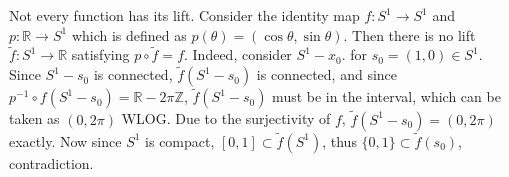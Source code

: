 %
\begin{exmp} Not every function has its lift. Consider the identity map $f:S^1\rightarrow S^1$ and $p:\mathbb{R}\rightarrow S^1$ which is defined as $p(\theta)=(\cos\theta,\sin\theta)$. Then there is no lift $\tilde{f}:S^1\rightarrow \mathbb{R}$ satisfying $p\circ \tilde{f}=f$. Indeed, consider $S^1-x_0$. for $s_0=(1,0)\in S^1$. Since $S^1-s_0$ is connected, $\tilde{f}(S^1-s_0)$ is connected, and since $p^{-1}\circ f(S^1-s_0)=\mathbb{R}-2\pi\mathbb{Z}$, $\tilde{f}(S^1-s_0)$ must be in the interval, which can be taken as $(0,2\pi)$ WLOG. Due to the surjectivity of $f$, $\tilde{f}(S^1-s_0)=(0,2\pi)$ exactly. Now since $S^1$ is compact, $[0,1]\subset \tilde{f}(S^1)$, thus $\{0,1\}\subset \tilde{f}(s_0)$, contradiction.
\end{exmp}

